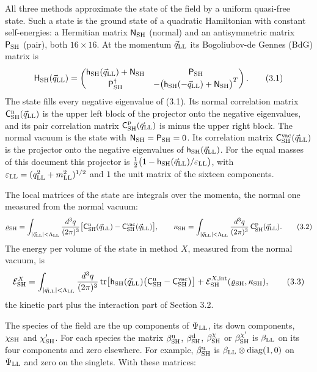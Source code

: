 \documentclass[
  10pt,
]{article}
\begin{document}
All three methods approximate the state of the field by a uniform
quasi-free state. Such a state is the ground state of a quadratic
Hamiltonian with constant self-energies: a Hermitian matrix
\(\mathsf N_{\rm SH}\) (normal) and an antisymmetric matrix
\(\mathsf P_{\rm SH}\) (pair), both \(16\times16\). At the momentum
\(\vec q_{\rm LL}\) its Bogoliubov-de Gennes (BdG) matrix is
\[\mathsf H_{\rm SH}(\vec q_{\rm LL})=\begin{pmatrix}\mathsf h_{\rm SH}(\vec q_{\rm LL})+\mathsf N_{\rm SH}&\mathsf P_{\rm SH}\\\mathsf P_{\rm SH}^\dagger&-\big(\mathsf h_{\rm SH}(-\vec q_{\rm LL})+\mathsf N_{\rm SH}\big)^T\end{pmatrix}.\tag{3.1}\]
The state fills every negative eigenvalue of (3.1). Its normal
correlation matrix \(\mathsf C^{\rm n}_{\rm SH}(\vec q_{\rm LL})\) is
the upper left block of the projector onto the negative eigenvalues, and
its pair correlation matrix
\(\mathsf C^{\rm p}_{\rm SH}(\vec q_{\rm LL})\) is minus the upper right
block. The normal vacuum is the state with
\(\mathsf N_{\rm SH}=\mathsf P_{\rm SH}=0\). Its correlation matrix
\(\mathsf C^{\rm vac}_{\rm SH}(\vec q_{\rm LL})\) is the projector onto
the negative eigenvalues of \(\mathsf h_{\rm SH}(\vec q_{\rm LL})\). For
the equal masses of this document this projector is
\(\tfrac12\big(\mathsf 1-\mathsf h_{\rm SH}(\vec q_{\rm LL})/\varepsilon_{\rm LL}\big)\),
with \(\varepsilon_{\rm LL}=(q_{\rm LL}^2+m_{\rm LL}^2)^{1/2}\) and
\(\mathsf 1\) the unit matrix of the sixteen components.

The local matrices of the state are integrals over the momenta, the
normal one measured from the normal vacuum:
\[\varrho_{\rm SH}=\int_{\lvert\vec q_{\rm LL}\rvert<\Lambda_{\rm LL}}\frac{d^3q}{(2\pi)^3}\big[\mathsf C^{\rm n}_{\rm SH}(\vec q_{\rm LL})-\mathsf C^{\rm vac}_{\rm SH}(\vec q_{\rm LL})\big],\qquad
\kappa_{\rm SH}=\int_{\lvert\vec q_{\rm LL}\rvert<\Lambda_{\rm LL}}\frac{d^3q}{(2\pi)^3}\,\mathsf C^{\rm p}_{\rm SH}(\vec q_{\rm LL}).\tag{3.2}\]
The energy per volume of the state in method \(X\), measured from the
normal vacuum, is
\[\mathcal E^X_{\rm SH}=\int_{\lvert\vec q_{\rm LL}\rvert<\Lambda_{\rm LL}}\frac{d^3q}{(2\pi)^3}\,\mathrm{tr}\big[\mathsf h_{\rm SH}(\vec q_{\rm LL})\big(\mathsf C^{\rm n}_{\rm SH}-\mathsf C^{\rm vac}_{\rm SH}\big)\big]+\mathcal E^{X,{\rm int}}_{\rm SH}(\varrho_{\rm SH},\kappa_{\rm SH}),\tag{3.3}\]
the kinetic part plus the interaction part of Section 3.2.

The species of the field are the up components of \(\Psi_{\rm LL}\), its
down components, \(\chi_{\rm SH}\) and \(\chi'_{\rm SH}\). For each
species the matrix \(\beta^{\rm u}_{\rm SH}\),
\(\beta^{\rm d}_{\rm SH}\), \(\beta^\chi_{\rm SH}\) or
\(\beta^{\chi'}_{\rm SH}\) is \(\beta_{\rm LL}\) on its four components
and zero elsewhere. For example, \(\beta^{\rm u}_{\rm SH}\) is
\(\beta_{\rm LL}\otimes\mathrm{diag}(1,0)\) on \(\Psi_{\rm LL}\) and
zero on the singlets. With these matrices:
\end{document}
